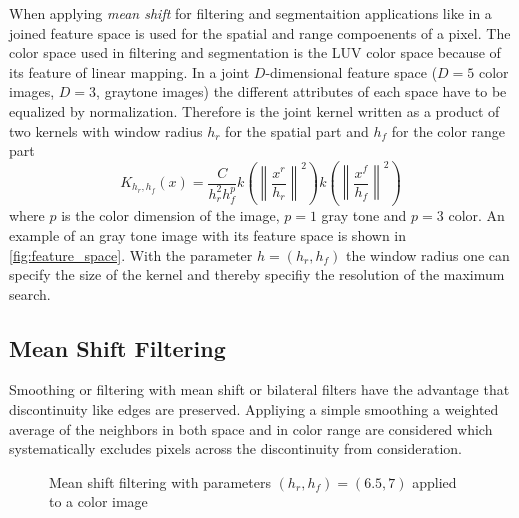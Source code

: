 When applying \emph{mean shift} for filtering and segmentaition applications
like in \citeauthor{citeulike:462300} \citep{citeulike:462300} a joined feature
space is used for the spatial and range compoenents of a pixel. The color space
used in filtering and segmentation is the \gls{LUV} color space because of its
feature of linear mapping. In a joint $D$-dimensional feature space ($D=5$ color
images, $D=3$, graytone images) the different attributes of each space have to be
equalized by normalization. Therefore is the joint kernel written as a product of
two kernels with window radius $h_r$ for the spatial part and $h_f$ for the 
color range part
\begin{equation}\label{eq:jokernel}
	K_{h_r, h_f}(x) = \frac{C}{h_r^2h_f^p}
	k \left( \left\lVert \frac{x^r}{h_r} \right\rVert^2\right) 
	k \left( \left\lVert \frac{x^f}{h_f} \right\rVert^2\right) 
\end{equation}
where $p$ is the color dimension of the image, $p=1$ gray tone and $p=3$ color. 
An example of an gray tone image with its feature space is shown in 
\autoref{fig:feature_space}. With the parameter $h = (h_r, h_f)$ the window
radius one can specify the size of the kernel and thereby specifiy the resolution
of the maximum search.

\subsection{Mean Shift Filtering} %
\label{sub:mean_shift_filtering}
Smoothing or filtering with mean shift or bilateral filters have the advantage
that discontinuity like edges are preserved. Appliying a simple smoothing a 
weighted average of the neighbors in both space and in color range are considered
which systematically excludes pixels across the discontinuity from consideration.

\begin{figure}[ht]
\centering
{}%
%
\caption{Mean shift filtering with parameters $(h_r, h_f) = (6.5, 7)$ applied to a color image}
\label{fig:filtsample}
\end{figure}

